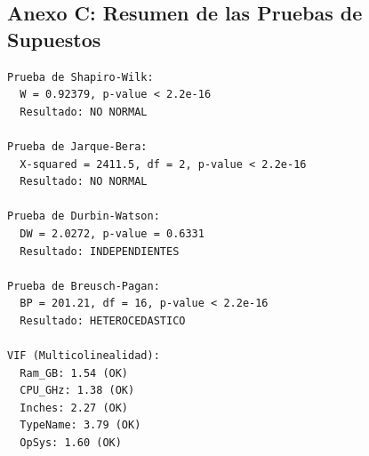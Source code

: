 \documentclass[12pt,a4paper]{article}
\begin{document}
\subsection{Anexo C: Resumen de las Pruebas de Supuestos}

\begin{verbatim}
Prueba de Shapiro-Wilk:
  W = 0.92379, p-value < 2.2e-16
  Resultado: NO NORMAL

Prueba de Jarque-Bera:
  X-squared = 2411.5, df = 2, p-value < 2.2e-16
  Resultado: NO NORMAL

Prueba de Durbin-Watson:
  DW = 2.0272, p-value = 0.6331
  Resultado: INDEPENDIENTES

Prueba de Breusch-Pagan:
  BP = 201.21, df = 16, p-value < 2.2e-16
  Resultado: HETEROCEDASTICO

VIF (Multicolinealidad):
  Ram_GB: 1.54 (OK)
  CPU_GHz: 1.38 (OK)
  Inches: 2.27 (OK)
  TypeName: 3.79 (OK)
  OpSys: 1.60 (OK)
\end{verbatim}
\end{document}

